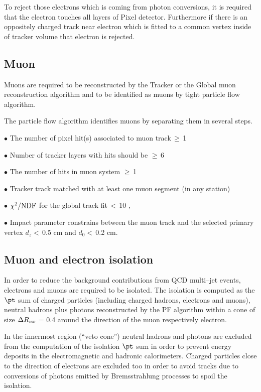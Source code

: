 To reject those electrons which is coming from photon conversions, it is required that the electron touches all layers of Pixel detector. Furthermore if there is an oppositely charged track near electron which is fitted to a common vertex inside of tracker volume that electron is rejected. 
\subsection{Muon}
Muons are required to be reconstructed by the Tracker or the Global muon reconstruction algorithm and to be identified as 
muons by tight particle flow algorithm.

The particle flow algorithm identifies  muons by separating them in several steps.


$\bullet$ The number of pixel hit(s) associated to muon track\,$\geq $\,1

$\bullet$ Number of tracker layers with hits should be $\geq $\,6

$\bullet$ The number of hits in muon system $\geq $\,1

$\bullet$ Tracker track matched with at least one muon segment (in any station)

$\bullet$ $\chi ^{2}/{\rm NDF} $ for the global track fit\,$< $\,10 ,

$\bullet$ Impact parameter constrains between the muon track and the selected primary vertex 
 $d_{z} < $\,0.5 cm and $d_{0} <$\,0.2 cm.

\subsection{Muon and electron isolation}

In order to reduce the background contributions from QCD multi–jet events, electrons and
muons are required to be isolated. The isolation is computed as the $\pt$ sum of charged particles (including charged hadrons, 
electrons and muons), neutral hadrons plus photons reconstructed by the PF algorithm within a cone of size
$\Delta R_{\rm iso}$ = 0.4 around the direction of the muon respectively electron. 

In the innermost region
(``veto cone'') neutral
hadrons and photons  are excluded from the computation of the isolation $\pt$ sum in order to prevent energy deposits in the electromagnetic and hadronic calorimeters. Charged particles close to the direction of electrons  are excluded too in order to avoid tracks due to conversions of photons emitted by Bremsstrahlung processes to spoil the isolation.

